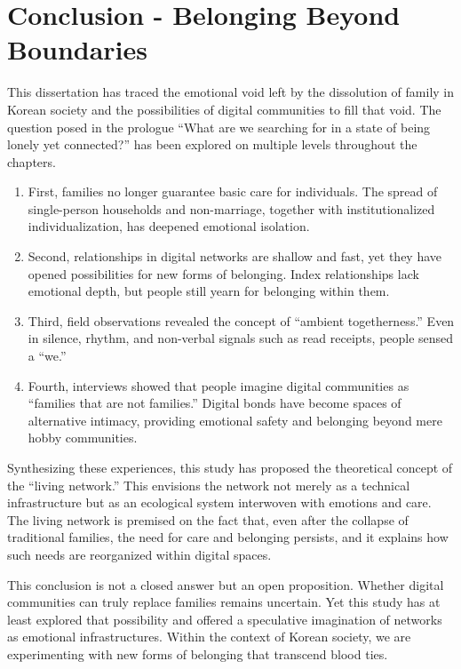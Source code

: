 \chapter{Conclusion - Belonging Beyond Boundaries}


This dissertation has traced the emotional void left by the dissolution of family in Korean society and the possibilities of digital communities to fill that void. The question posed in the prologue “What are we searching for in a state of being lonely yet connected?” has been explored on multiple levels throughout the chapters.  

\begin{enumerate}
    \item First, families no longer guarantee basic care for individuals. The spread of single-person households and non-marriage, together with institutionalized individualization, has deepened emotional isolation.
    \item Second, relationships in digital networks are shallow and fast, yet they have opened possibilities for new forms of belonging. Index relationships lack emotional depth, but people still yearn for belonging within them.
    \item Third, field observations revealed the concept of “ambient togetherness.” Even in silence, rhythm, and non-verbal signals such as read receipts, people sensed a “we.”
    \item Fourth, interviews showed that people imagine digital communities as “families that are not families.” Digital bonds have become spaces of alternative intimacy, providing emotional safety and belonging beyond mere hobby communities.
\end{enumerate}

Synthesizing these experiences, this study has proposed the theoretical concept of the “living network.” This envisions the network not merely as a technical infrastructure but as an ecological system interwoven with emotions and care. The living network is premised on the fact that, even after the collapse of traditional families, the need for care and belonging persists, and it explains how such needs are reorganized within digital spaces.  

This conclusion is not a closed answer but an open proposition. Whether digital communities can truly replace families remains uncertain. Yet this study has at least explored that possibility and offered a speculative imagination of networks as emotional infrastructures. Within the context of Korean society, we are experimenting with new forms of belonging that transcend blood ties.  

